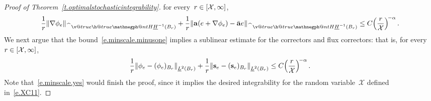 \documentclass[11pt]{article} %
\makeatletter
\numberwithin{equation}{section}
\theoremstyle{definition}
\let\originalleft\left
\let\originalright\right
\renewcommand{\left}{\mathopen{}\mathclose\bgroup\originalleft}
\renewcommand{\right}{\aftergroup\egroup\originalright}
\renewcommand*{\hat}{\widehat}
\newcommand{\s}{\mathbf{s}}
\renewcommand{\a}{\mathbf{a}}
\newcommand{\ahom}{\bar{\a}}
\newcommand{\X}{\mathcal{X}}
\newcommand{\negphantom}{\v@true\h@true\negph@nt}
\newcommand{\negph@nt}{\ifmmode\expandafter\mathpalette 
  \expandafter\mathnegph@nt\else\expandafter\makenegph@nt\fi}
\newcommand{\makenegph@nt}[1]{%
  \setbox\z@\hbox{\color@begingroup#1\color@endgroup}\finnegph@nt}
\newcommand{\finnegph@nt}{%
  \setbox\tw@\null 
  \ifv@ \ht\tw@\ht\z@\dp\tw@\dp\z@\fi \ifh@\wd\tw@-\wd\z@\fi\box\tw@}
\newcommand{\mathnegph@nt}[2]{%
  \setbox\z@\hbox{$\m@th #1{#2}$}\finnegph@nt}
\newcommand{\Hminusul}{\hat{\phantom{H}}\negphantom{H}\underline{H}^{-1}}
\makeatother
\begin{document}
\begin{proof}[Proof of Theorem~\ref{t.optimalstochasticintegrability}]
for every~$r \in \left[\X,\infty \right]$,
\begin{equation}
\label{e.minscale.minusone}
\frac1r \left\| \nabla \phi_e \right\|_{\Hminusul(B_{r})} 
+
\frac1r \left\| \a(e+ \nabla \phi_e) - \ahom e \right\|_{\Hminusul(B_{r})} \leq C \Bigl( \frac{r}{\X}\Bigr)^{\!-\alpha} 
\,.
\end{equation}
We next argue that the bound~\eqref{e.minscale.minusone} implies a sublinear estimate for the correctors and flux correctors: that is, for every~$r \in \left[\X,\infty \right]$,
\begin{equation}
\label{e.minscale.yes}
\frac1r \left\| \phi_e - (\phi_e)_{B_r} \right\|_{\underline{L}^2(B_{r})} 
+
\frac1r \left\| \s_e - (\s_e)_{B_r} \right\|_{\underline{L}^2(B_{r})} \leq C \Bigl( \frac{r}{\X}\Bigr)^{\!-\alpha} 
\,.
\end{equation}
Note that~\eqref{e.minscale.yes} would finish the proof, since it implies the desired integrability for the random variable~$\X$ defined in~\eqref{e.XC11}.

\smallskip


\end{proof}
\end{document}
